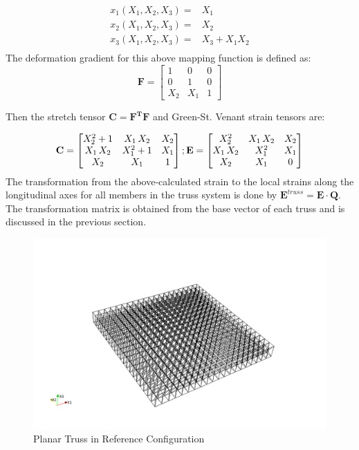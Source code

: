 \begin{equation}
\begin{aligned}
x_1(X_1,X_2,X_3) = & X_1 \\
x_2(X_1,X_2,X_3) = & X_2 \\
x_3(X_1,X_2,X_3) = & X_3+X_1 X_2 \\
\end{aligned}
\label{doubly_curved_mapping:eqn}
\end{equation}
The deformation gradient for this above mapping function is defined as:
\begin{equation}
\mathbf F=
\begin{bmatrix}
1&0&0 \\
0&1&0 \\
X_2 & X_1 & 1
\end{bmatrix}
\label{deformation_gradient_doubly_curved_mapping:eqn}
\end{equation}

Then the stretch tensor $\mathbf C=\mathbf {F^T F}$ and Green-St. Venant strain tensors are:

\begin{equation}
\mathbf C=
\begin{bmatrix}
X_{2}^2+1&X_{1}\,
X_{2}&X_{2}\cr X_{1}\,X_{2}&X_{1}^2+1&X_{
 1}\cr X_{2}&X_{1}&1\cr 
\end{bmatrix}
; \mathbf E=
\begin{bmatrix}
X_{2}^2&X_{1}\,X_{2}&X_{2}\cr X_{1}\,X_{2}&X_{1}^2&X_{1}\cr X_{2}&X_{1}&0\cr 
 \end{bmatrix}
\label{green_deformation_tensor_doubly_curved_mapping:eqn}
\end{equation} 
The transformation from the above-calculated strain to the local strains along the longitudinal axes for all members in the truss system is done by $\mathbf E^{truss}=\mathbf E \cdot \mathbf {Q}$. The transformation matrix is obtained from the base vector of each truss and is discussed in the previous section.

\begin{figure} 
\centering
\includegraphics[width=5.0in]{./chap_5_active_trusses/images_space_filler/planar_truss_ref_config.png}
\caption{Planar Truss in Reference Configuration}
\label{fig:planar_truss_ref_config}
\end{figure}

